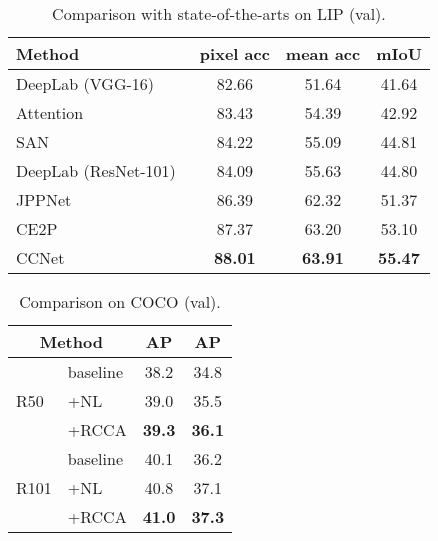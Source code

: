\documentclass[10pt,journal,compsoc]{IEEEtran}
\begin{document}
        \begin{table}[!t]
        \renewcommand{\arraystretch}{1.3}
        \setlength{\tabcolsep}{0.8em}
        \caption{Comparison with state-of-the-arts on LIP (val).}
        \label{tab:lip}
        \centering \small
        \begin{tabular}{|l|c|c|c|}
            \hline
            Method & pixel acc & mean acc & mIoU  \\
            \hline
            DeepLab (VGG-16)~\cite{chen2018deeplab} &  82.66 & 51.64 & 41.64\\
            Attention~\cite{chen2016attention} & 83.43 & 54.39 & 42.92\\
            SAN~\cite{huang2019sanet} & 84.22 & 55.09 & 44.81 \\
            DeepLab (ResNet-101)~\cite{chen2018deeplab} & 84.09 & 55.63 & 44.80 \\
            JPPNet~\cite{liang2018look} & 86.39 & 62.32 & 51.37 \\
            CE2P~\cite{ruan2019devil} & 87.37 & 63.20 & 53.10 \\
            \hline
            CCNet & \textbf{88.01} & \textbf{63.91} & \textbf{55.47} \\
            \hline
        \end{tabular}
    \end{table}
    
    \begin{table}[!t]
        \renewcommand{\arraystretch}{1.3}
        \setlength{\tabcolsep}{1.2em}
        \caption{Comparison on COCO (val).}
        \label{tab:coco}
        \centering \small
        \begin{tabular}{ | l  l | c | c | }
            \hline
            \multicolumn{2}{|c|}{Method} & AP & AP \\ \hline
            \multirow{3}{*}{R50} & baseline &  38.2 & 34.8 \\ & +NL     &  39.0 & 35.5 \\ 
            & +RCCA     & \textbf{39.3} & \textbf{36.1} \\ \hline
            \multirow{3}{*}{R101} & baseline &  40.1 & 36.2 \\ & +NL     &  40.8 & 37.1 \\ 
            & +RCCA     & \textbf{41.0} & \textbf{37.3} \\ \hline
            
        \end{tabular}
    \end{table}
    
\end{document}
